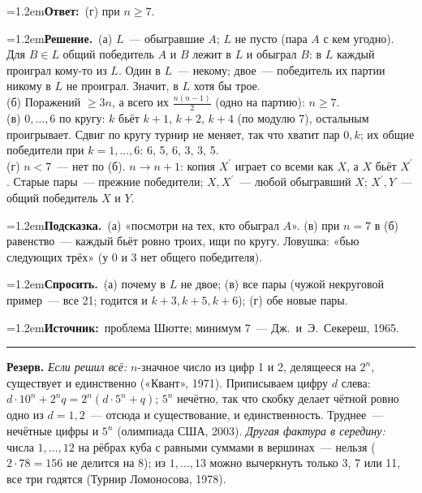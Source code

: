 \documentclass[10pt,a4paper]{article}
\newcommand{\pole}[2]{\par\noindent\hangindent=1.2em\textbf{#1}\ #2\par}
\begin{document}
\pole{Ответ:}{(г) при $n\ge7$.}
\pole{Решение.}{(а) $L$~--- обыгравшие $A$; $L$ не пусто (пара $A$ с кем угодно). Для $B\in L$ общий победитель $A$ и $B$ лежит в $L$ и обыграл $B$: в $L$ каждый проиграл кому-то из $L$. Один в $L$~--- некому; двое~--- победитель их партии никому в $L$ не проиграл. Значит, в $L$ хотя бы трое.\\ (б) Поражений $\ge3n$, а всего их $\tfrac{n(n-1)}2$ (одно на партию): $n\ge7$.\\ (в) $0,\ldots,6$ по кругу: $k$ бьёт $k+1$, $k+2$, $k+4$ (по модулю 7), остальным проигрывает. Сдвиг по кругу турнир не меняет, так что хватит пар $0,k$; их общие победители при $k=1,\ldots,6$: 6, 5, 6, 3, 3, 5.\\ (г) $n<7$~--- нет по (б). $n\to n+1$: копия $X^{\prime}$ играет со всеми как $X$, а $X$ бьёт $X^{\prime}$. Старые пары~--- прежние победители; $X,X^{\prime}$~--- любой обыгравший $X$; $X^{\prime},Y$~--- общий победитель $X$ и $Y$.}
\pole{Подсказка.}{(а) «посмотри на тех, кто обыграл $A$». (в) при $n=7$ в (б) равенство~--- каждый бьёт ровно троих, ищи по кругу. Ловушка: «бью следующих трёх» (у 0 и 3 нет общего победителя).}
\pole{Спросить.}{(а) почему в $L$ не двое; (в) все пары (чужой некруговой пример~--- все 21; годится и $k+3,k+5,k+6$); (г) обе новые пары.}
{\small\pole{Источник:}{проблема Шютте; минимум 7~--- Дж.~и~Э.~Секереш, 1965.}}

\vspace{8pt}\hrule\vspace{4pt}
\textbf{Резерв.}
\textit{Если решил всё:} $n$-значное число из цифр 1 и 2, делящееся на $2^n$, существует и единственно («Квант», 1971).
Приписываем цифру $d$ слева: $d\cdot10^n+2^nq=2^n(d\cdot5^n+q)$; $5^n$ нечётно, так что скобку делает чётной ровно одно из $d=1,2$~--- отсюда и существование, и единственность.
Труднее~--- нечётные цифры и $5^n$ (олимпиада США, 2003).
\textit{Другая фактура в середину:} числа $1,\ldots,12$ на рёбрах куба с равными суммами в вершинах~--- нельзя ($2\cdot78=156$ не делится на 8);
из $1,\ldots,13$ можно вычеркнуть только 3, 7 или 11, все три годятся (Турнир Ломоносова, 1978).
\end{document}
